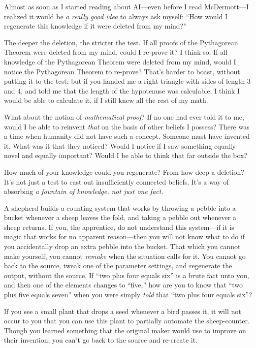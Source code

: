 {
 Almost as soon as I started reading about AI---even before I read
McDermott---I realized it would be \textit{a really good idea} to
always ask myself: ``How would I regenerate this
knowledge if it were deleted from my mind?''}

{
 The deeper the deletion, the stricter the test. If all proofs of
the Pythagorean Theorem were deleted from my mind, could I re-prove it?
I think so. If all knowledge of the Pythagorean Theorem were deleted
from my mind, would I notice the Pythagorean Theorem to re-prove?
That's harder to boast, without putting it to the test;
but if you handed me a right triangle with sides of length 3 and 4, and
told me that the length of the hypotenuse was calculable, I think I
would be able to calculate it, if I still knew all the rest of my
math.}

{
 What about the notion of \textit{mathematical proof}? If no one
had ever told it to me, would I be able to reinvent \textit{that} on
the basis of other beliefs I possess? There was a time when humanity
did not have such a concept. Someone must have invented it. What was it
that they noticed? Would I notice if I saw something equally novel and
equally important? Would I be able to think that far outside the box?}

{
 How much of your knowledge could you regenerate? From how deep a
deletion? It's not just a test to cast out
insufficiently connected beliefs. It's a way of
absorbing \textit{a fountain of knowledge, not just one fact.}}

{
 A shepherd builds a counting system that works by throwing a
pebble into a bucket whenever a sheep leaves the fold, and taking a
pebble out whenever a sheep returns. If you, the apprentice, do not
understand this system---if it is magic that works for no apparent
reason---then you will not know what to do if you accidentally drop an
extra pebble into the bucket. That which you cannot make yourself, you
cannot \textit{remake} when the situation calls for it. You cannot go
back to the source, tweak one of the parameter settings, and regenerate
the output, without the source. If ``two plus four
equals six'' is a brute fact unto you, and then one
of the elements changes to ``five,''
how are you to know that ``two plus five equals
seven'' when you were simply \textit{told} that
``two plus four equals six''?}

{
 If you see a small plant that drops a seed whenever a bird passes
it, it will not occur to you that you can use this plant to partially
automate the sheep-counter. Though you learned something that the
original maker would use to improve on their invention, you
can't go back to the source and re-create it.}

